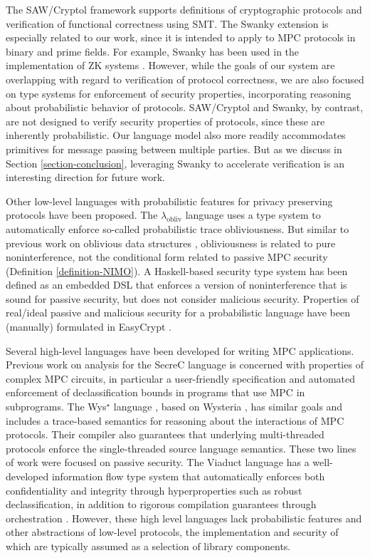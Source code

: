 The SAW/Cryptol framework \cite{10.1007/978-3-319-48869-1_5} supports
definitions of cryptographic protocols and verification of functional
correctness using SMT. The Swanky extension \cite{swanky} is
especially related to our work, since it is intended to apply to MPC
protocols in binary and prime fields. For example, Swanky has been
used in the implementation of ZK systems
\cite{cryptoeprint:2020/1410}. However, while the goals of our system
are overlapping with regard to verification of protocol correctness,
we are also focused on type systems for enforcement of security
properties, incorporating reasoning about probabilistic behavior of
protocols. SAW/Cryptol and Swanky, by contrast, are not designed to
verify security properties of protocols, since these are inherently
probabilistic. Our language model also more readily accommodates
primitives for message passing between multiple parties. But as we
discuss in Section \ref{section-conclusion}, leveraging Swanky to
accelerate verification is an interesting direction for future work.

Other low-level languages with probabilistic features for privacy
preserving protocols have been proposed. The
$\lambda_{\mathrm{obliv}}$ language \cite{darais2019language} uses a
type system to automatically enforce so-called probabilistic trace
obliviousness.  But similar to previous work on oblivious data
structures \cite{10.1145/3498713}, obliviousness is related to pure
noninterference, not the conditional form related to passive MPC
security (Definition \ref{definition-NIMO}). A Haskell-based security
type system has been defined as an embedded DSL \cite{6266151} that
enforces a version of noninterference that is sound for passive
security, but does not consider malicious security. Properties of
real/ideal passive and malicious security for a probabilistic language
have been (manually) formulated in EasyCrypt \cite{8429300}.

Several high-level languages have been developed for writing MPC
applications. Previous work on analysis for the
SecreC language \cite{almeida2018enforcing,10.1145/2637113.2637119} is
concerned with properties of complex MPC circuits, in particular a
user-friendly specification and automated enforcement of
declassification bounds in programs that use MPC in subprograms. The
Wys$^\star$ language \cite{wysstar}, based on Wysteria
\cite{rastogi2014wysteria}, has similar goals and includes a
trace-based semantics for reasoning about the interactions of MPC
protocols. Their compiler also guarantees that underlying
multi-threaded protocols enforce the single-threaded source language
semantics. These two lines of work were focused on passive
security. The Viaduct language \cite{10.1145/3453483.3454074} has a
well-developed information flow type system that automatically
enforces both confidentiality and integrity through hyperproperties
such as robust declassification, in addition to rigorous compilation
guarantees through orchestration \cite{viaduct-UC}. However, these
high level languages lack probabilistic features and other
abstractions of low-level protocols, the implementation and security
of which are typically assumed as a selection of library components.


